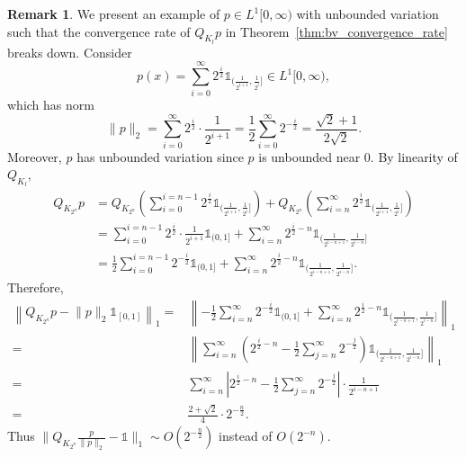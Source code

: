 \documentclass[a4paper]{article}
\theoremstyle{definition}
\newtheorem{remark}[theorem]{Remark}%
\numberwithin{equation}{section}
\numberwithin{theorem}{section}
\begin{document}
{\begin{remark}
    We present an example of $p\in L^1[0,\infty)$ with unbounded variation such that the convergence rate of $Q_{K_l}p$ in Theorem~\ref{thm:bv_convergence_rate} breaks down. Consider
    \begin{equation*}
        p(x) = \sum_{i=0}^\infty 2^{\frac{i}{2}} \mathds{1}_{(\frac{1}{2^{i+1}},\frac{1}{2^i}]}\in L^1[0,\infty),
    \end{equation*}
    which has norm
    \begin{equation*}
        \lVert p\rVert_2 = \sum_{i=0}^\infty 2^\frac{i}{2}\cdot\frac{1}{2^{i+1}} = \frac{1}{2}\sum_{i=0}^{\infty} 2^{-\frac{i}{2}} = \frac{\sqrt{2}+1}{2\sqrt{2}}.
    \end{equation*}
    Moreover, $p$ has unbounded variation since $p$ is unbounded near 0. By linearity of $Q_{K_l}$,
    \begin{align*}
        Q_{K_{2^n}}p &= Q_{K_{2^n}}\left(\sum_{i=0}^{i=n-1}2^{\frac{i}{2}}\mathds{1}_{(\frac{1}{2^{i+1}},\frac{1}{2^i}]}\right) + Q_{K_{2^n}}\left(\sum_{i=n}^\infty 2^{\frac{i}{2}} \mathds{1}_{(\frac{1}{2^{i+1}},\frac{1}{2^i}]}\right)\\
        &= \sum_{i=0}^{i=n-1} 2^{\frac{i}{2}}\cdot\frac{1}{2^{i+1}}\mathds{1}_{(0,1]} + \sum_{i=n}^\infty 2^{\frac{i}{2}-n}\mathds{1}_{(\frac{1}{2^{i-n+1}},\frac{1}{2^{i-n}}]} \\
        &= \frac{1}{2}\sum_{i=0}^{i=n-1} 2^{-\frac{i}{2}}\mathds{1}_{(0,1]} + \sum_{i=n}^\infty 2^{\frac{i}{2}-n}\mathds{1}_{(\frac{1}{2^{i-n+1}},\frac{1}{2^{i-n}}]}.
    \end{align*}
    Therefore,
    \begin{align*}
        \left\lVert Q_{K_{2^n}}p-\lVert p\rVert_2\mathds{1}_{[0,1]}\right\rVert_1 = &\left\lVert- \frac{1}{2}\sum_{i=n}^{\infty} 2^{-\frac{i}{2}}\mathds{1}_{(0,1]} + \sum_{i=n}^\infty 2^{\frac{i}{2}-n}\mathds{1}_{(\frac{1}{2^{i-n+1}},\frac{1}{2^{i-n}}]} \right\rVert_1 \\
        = &\left\lVert \sum_{i=n}^\infty \left(2^{\frac{i}{2}-n} - \frac{1}{2}\sum_{j=n}^{\infty} 2^{-\frac{j}{2}}\right)\mathds{1}_{(\frac{1}{2^{i-n+1}},\frac{1}{2^{i-n}}]} \right\rVert_1 \\
        = &\sum_{i=n}^\infty \left|2^{\frac{i}{2}-n}- \frac{1}{2}\sum_{j=n}^{\infty} 2^{-\frac{j}{2}}\right|\cdot\frac{1}{2^{i-n+1}}  \\
        = &\frac{2+\sqrt{2}}{4}\cdot2^{-\frac{n}{2}}.
    \end{align*}
    Thus $\lVert Q_{K_{2^n}}\frac{p}{\lVert p\rVert_2}-\mathds{1}\rVert_1\sim O(2^{-\frac{n}{2}})$ instead of $O(2^{-n})$. 
\end{remark}

}
\end{document}
